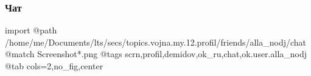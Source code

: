  
 
 
 
 

\subsubsection{Чат}

\ifcmt
  import
  @path /home/me/Documents/lts/secs/topics.vojna.my.12.profil/friends/alla_nodj/chat
  @match Screenshot*.png
  @tags scrn,profil,demidov,ok_ru,chat,ok.user.alla_nodj
  @tab cols=2,no_fig,center
\fi
